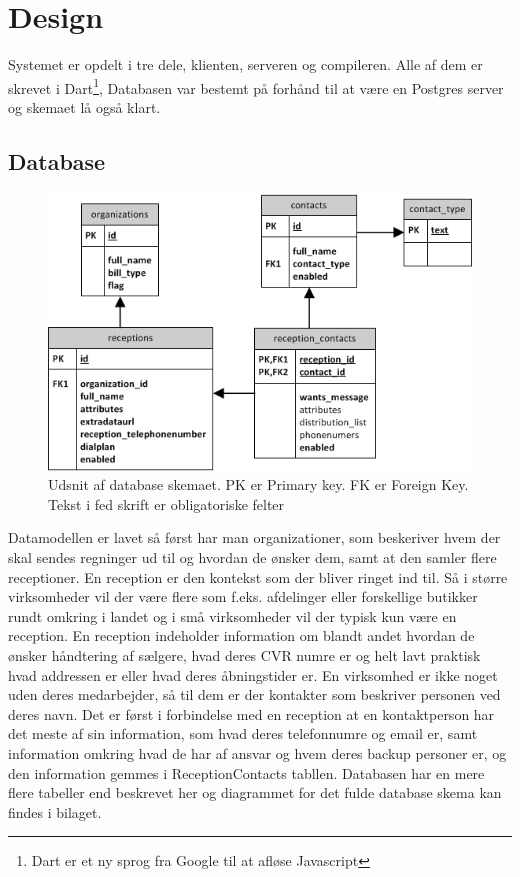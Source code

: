 \chapter{Design}
Systemet er opdelt i tre dele, klienten, serveren og compileren. Alle af dem er skrevet i Dart\footnote{Dart er et ny sprog fra Google til at afløse Javascript},
Databasen var bestemt på forhånd til at være en Postgres server og skemaet lå også klart.

\section{Database}
\begin{figure}[ht!]
\centering
\includegraphics[scale=0.7]{images/ER_Basic.png}
\caption{Udsnit af database skemaet. PK er Primary key. FK er Foreign Key. Tekst i fed skrift er obligatoriske felter}
\label{fig:erbasic}
\end{figure}
Datamodellen er lavet så først har man organizationer, som beskeriver hvem der skal sendes regninger ud til og hvordan de ønsker dem, samt at den samler flere receptioner. En reception er den kontekst som der bliver ringet ind til. Så i større virksomheder vil der være flere som f.eks. afdelinger eller forskellige butikker rundt omkring i landet og i små virksomheder vil der typisk kun være en reception. En reception indeholder information om blandt andet hvordan de ønsker håndtering af sælgere, hvad deres CVR numre er og helt lavt praktisk hvad addressen er eller hvad deres åbningstider er. En virksomhed er ikke noget uden deres medarbejder, så til dem er der kontakter som beskriver personen ved deres navn. Det er først i forbindelse med en reception at en kontaktperson har det meste af sin information, som hvad deres telefonnumre og email er, samt information omkring hvad de har af ansvar og hvem deres backup personer er, og den information gemmes i ReceptionContacts tabllen.
Databasen har en mere flere tabeller end beskrevet her og diagrammet for det fulde database skema kan findes i bilaget.

